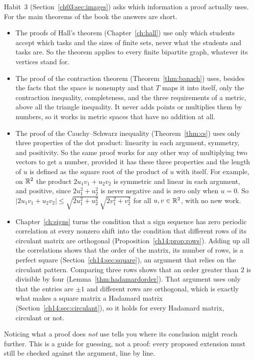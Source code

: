 Habit~3 (Section~\ref{ch03:sec:images}) asks which information a proof actually uses. For the main theorems of the book the answers are short.
\begin{itemize}
\item The proofs of Hall's theorem (Chapter~\ref{ch:hall}) use only which students accept which tasks and the sizes of finite sets, never what the students and tasks are. So the theorem applies to every finite bipartite graph, whatever its vertices stand for.
\item The proof of the contraction theorem (Theorem~\ref{thm:banach}) uses, besides the facts that the space is nonempty and that $T$ maps it into itself, only the contraction inequality, completeness, and the three requirements of a metric, above all the triangle inequality. It never adds points or multiplies them by numbers, so it works in metric spaces that have no addition at all.
\item The proof of the Cauchy--Schwarz inequality (Theorem~\ref{thm:cs}) uses only three properties of the dot product: linearity in each argument, symmetry, and positivity. So the same proof works for any other way of multiplying two vectors to get a number, provided it has these three properties and the length of $u$ is defined as the square root of the product of $u$ with itself. For example, on $\mathbb R^2$ the product $2u_1v_1+u_2v_2$ is symmetric and linear in each argument, and positive, since $2u_1^2+u_2^2$ is never negative and is zero only when $u=0$. So $|2u_1v_1+u_2v_2|\le\sqrt{2u_1^2+u_2^2}\,\sqrt{2v_1^2+v_2^2}$ for all $u,v\in\mathbb R^2$, with no new work.
\item Chapter~\ref{ch:signs} turns the condition that a sign sequence has zero periodic correlation at every nonzero shift into the condition that different rows of its circulant matrix are orthogonal (Proposition~\ref{ch14:prop:rows}). Adding up all the correlations shows that the order of the matrix, its number of rows, is a perfect square (Section~\ref{ch14:sec:square}), an argument that relies on the circulant pattern. Comparing three rows shows that an order greater than $2$ is divisible by four (Lemma~\ref{thm:hadamardorder}). That argument uses only that the entries are $\pm1$ and different rows are orthogonal, which is exactly what makes a square matrix a Hadamard matrix (Section~\ref{ch14:sec:circulant}), so it holds for every Hadamard matrix, circulant or not.
\end{itemize}
Noticing what a proof does \emph{not} use tells you where its conclusion might reach further. This is a guide for guessing, not a proof: every proposed extension must still be checked against the argument, line by line.

